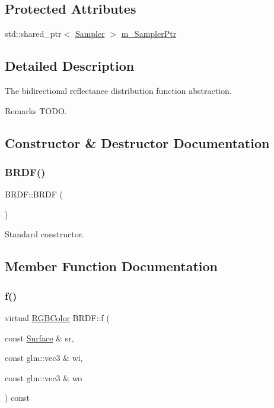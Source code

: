 \subsection*{Protected Attributes}
\begin{DoxyCompactItemize}
\item 
std\+::shared\+\_\+ptr$<$ \hyperlink{class_sampler}{Sampler} $>$ \hyperlink{class_b_r_d_f_a07f3aba126e7836a7cb86663428808f2}{m\+\_\+\+Sampler\+Ptr}
\end{DoxyCompactItemize}


\subsection{Detailed Description}
The bidirectional reflectance distribution function abstraction. \begin{DoxyRemark}{Remarks}
T\+O\+DO. 
\end{DoxyRemark}


\subsection{Constructor \& Destructor Documentation}
\hypertarget{class_b_r_d_f_a453d38b012c433272b117864f1902c52}{}\label{class_b_r_d_f_a453d38b012c433272b117864f1902c52} 
\subsubsection{\texorpdfstring{B\+R\+D\+F()}{BRDF()}}
{\footnotesize\ttfamily B\+R\+D\+F\+::\+B\+R\+DF (\begin{DoxyParamCaption}{ }\end{DoxyParamCaption})}

Standard constructor. 

\subsection{Member Function Documentation}
\hypertarget{class_b_r_d_f_af3d87a4237b7b25b72ad1fb5027721bb}{}\label{class_b_r_d_f_af3d87a4237b7b25b72ad1fb5027721bb} 
\subsubsection{\texorpdfstring{f()}{f()}}
{\footnotesize\ttfamily virtual \hyperlink{class_r_g_b_color}{R\+G\+B\+Color} B\+R\+D\+F\+::f (\begin{DoxyParamCaption}\item[{const \hyperlink{class_surface}{Surface} \&}]{sr,  }\item[{const glm\+::vec3 \&}]{wi,  }\item[{const glm\+::vec3 \&}]{wo }\end{DoxyParamCaption}) const\hspace{0.3cm}{\ttfamily [virtual]}}

